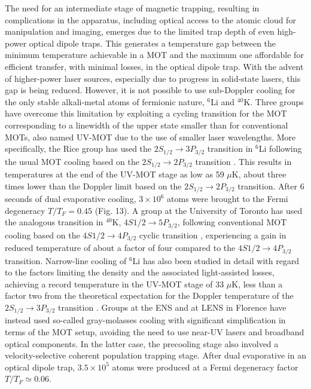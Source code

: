 \documentclass[pra,letterpaper,twocolumn,showpacs,superscriptaddress]{revtex4}
\begin{document}
The need for an intermediate stage of magnetic trapping, resulting in complications in the apparatus, including optical access to the atomic cloud 
for manipulation and imaging, emerges due to the limited trap depth of even high-power optical dipole traps. This generates a temperature gap between 
the minimum temperature achievable in a MOT and the maximum one affordable for efficient transfer, with minimal losses, in the optical dipole trap. 
With the advent of higher-power laser sources, especially due to progress in solid-state lasers, this gap is being reduced. However,  
it is not possible to use sub-Doppler cooling for the only stable alkali-metal atoms of fermionic nature, ${}^6$Li and ${}^{40}$K. 
Three groups have overcome this limitation by exploiting a cycling transition for the MOT corresponding to a linewidth of the upper state smaller than 
for conventional MOTs, also named UV-MOT due to the use of smaller laser wavelengths. More specifically, the Rice group has used the $2S_{1/2}\rightarrow 3P_{3/2}$ 
transition in ${}^6$Li  following the usual MOT cooling based on the $2S_{1/2}\rightarrow 2P_{3/2}$ transition \cite{Duarte2011}. 
This results in temperatures at the end of the UV-MOT stage as low as 59 $\mu$K, about three times lower than the Doppler limit based 
on the $2S_{1/2}\rightarrow 2P_{3/2}$ transition. After 6 seconds of dual evaporative cooling, $3 \times 10^6$  atoms were brought to the 
Fermi degeneracy $T/T_F=0.45$ (Fig. 13). A group at the University of Toronto has used the analogous transition in ${}^{40}$K, $4S{1/2} \rightarrow 5P_{3/2}$, 
following conventional MOT cooling based on the $4S{1/2} \rightarrow 4P_{3/2}$ cyclic transition \cite{McKay2011}, experiencing a gain in reduced temperature of 
about a factor of four compared to the $4S{1/2} \rightarrow 4P_{3/2}$ transition.  Narrow-line cooling of ${}^6$Li has also been studied in detail with regard to the 
factors limiting the density and the associated light-assisted losses, achieving a record temperature in the UV-MOT stage of 33 $\mu$K, less than a factor two from 
the theoretical expectation for the Doppler temperature of the $2S_{1/2}\rightarrow 3P_{3/2}$ transition \cite{Sebastian2014}. 
Groups at the ENS \cite{Fernandes2012} and at LENS in Florence \cite{Burchianti2014} have instead used so-called gray-molasses cooling with 
significant simplification in terms of the MOT setup, avoiding the need to use near-UV lasers and broadband optical components. 
In the latter case, the precooling stage also involved a velocity-selective coherent population trapping stage. After dual evaporative in an optical dipole 
trap, $3.5 \times 10^5$ atoms were produced at a Fermi degeneracy factor $T/T_F \simeq 0.06$. 
\end{document}
